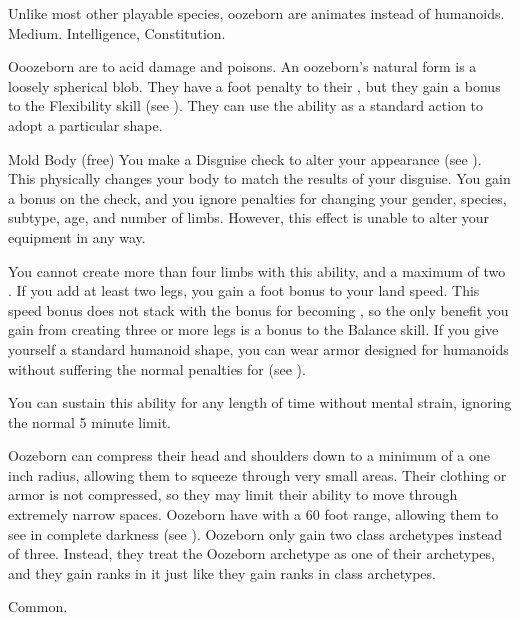      Unlike most other playable species, oozeborn are animates instead of humanoids.
     Medium.
      Intelligence,  Constitution.
    \begin{itemize}
         Ooozeborn are  to acid damage and poisons.
         An oozeborn's natural form is a loosely spherical blob.
            They have a  foot penalty to their , but they gain a  bonus to the Flexibility skill (see ).
            They can use the  ability as a standard action to adopt a particular shape.
            \begin{sustainability}{Mold Body}{ (free)}
                \rankline
                You make a Disguise check to alter your appearance (see ).
                This physically changes your body to match the results of your disguise.
                You gain a  bonus on the check, and you ignore penalties for changing your gender, species, subtype, age, and number of limbs.
                However, this effect is unable to alter your equipment in any way.

                You cannot create more than four limbs with this ability, and a maximum of two .
                If you add at least two legs, you gain a  foot bonus to your land speed.
                This speed bonus does not stack with the bonus for becoming , so the only benefit you gain from creating three or more legs is a  bonus to the Balance skill.
                If you give yourself a standard humanoid shape, you can wear armor designed for humanoids without suffering the normal penalties for  (see ).

                You can sustain this ability for any length of time without mental strain, ignoring the normal 5 minute limit.
            \end{sustainability}
         Oozeborn can compress their head and shoulders down to a minimum of a one inch radius, allowing them to squeeze through very small areas.
            Their clothing or armor is not compressed, so they may limit their ability to move through extremely narrow spaces.
         Oozeborn have  with a 60 foot range, allowing them to see in complete darkness (see ).
         Oozeborn only gain two class archetypes instead of three.
            Instead, they treat the Oozeborn archetype as one of their archetypes, and they gain ranks in it just like they gain ranks in class archetypes.
    \end{itemize}
     Common.
    
